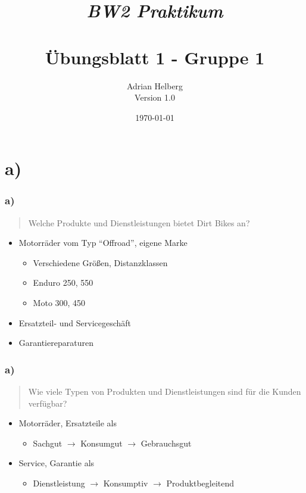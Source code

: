 \documentclass{beamer}
\title{
	\textit{BW2 Praktikum} \\
	\textbf{\\ \"Ubungsblatt 1 - Gruppe 1}
}
\author{Adrian Helberg \\ Version 1.0}
\date{\today}
\begin{document}

\maketitle

\section{a)}
\begin{frame}
\frametitle{a)}

\begin{quote}
Welche Produkte und Dienstleistungen bietet Dirt Bikes an? 
\end{quote}

\begin{itemize}
\setlength{\itemsep}{20pt}
\item Motorr\"ader vom Typ ``Offroad'', eigene Marke
\begin{itemize}
\item Verschiedene Gr\"oßen, Distanzklassen
\item Enduro 250, 550
\item Moto 300, 450
\end{itemize}
\item Ersatzteil- und Servicegesch\"aft
\item Garantiereparaturen
\end{itemize}

\end{frame}

\begin{frame}
\frametitle{a)}

\begin{quote}
Wie viele Typen von Produkten und Dienstleistungen sind für die Kunden verfügbar?
\end{quote}

\begin{itemize}
\setlength{\itemsep}{12pt}
\item Motorräder, Ersatzteile als
\begin{itemize}
\item Sachgut $\rightarrow$ Konsumgut $\rightarrow$ Gebrauchsgut
\end{itemize}
\item Service, Garantie als
\begin{itemize}
\item Dienstleistung $\rightarrow$ Konsumptiv $\rightarrow$ Produktbegleitend
\end{itemize}
\end{itemize}

\end{frame}
\end{document}
